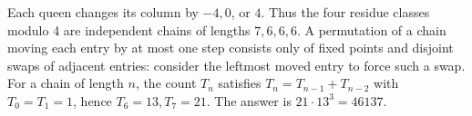 Each queen changes its column by $-4,0$, or $4$. Thus the four residue classes modulo 4 are independent chains of lengths $7,6,6,6$. A permutation of a chain moving each entry by at most one step consists only of fixed points and disjoint swaps of adjacent entries: consider the leftmost moved entry to force such a swap. For a chain of length $n$, the count $T_n$ satisfies $T_n=T_{n-1}+T_{n-2}$ with $T_0=T_1=1$, hence $T_6=13,T_7=21$. The answer is $21\cdot13^3=\boxed{46137}$.
